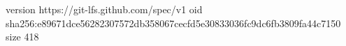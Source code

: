 version https://git-lfs.github.com/spec/v1
oid sha256:e89671dce56282307572db358067cecfd5e30833036fc9dc6fb3809fa44c7150
size 418
